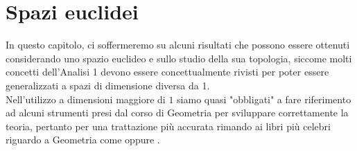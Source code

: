 \chapter{Spazi euclidei}
	\pagestyle{plain}
	\thispagestyle{empty}
	\pagestyle{fancy}	
	In questo capitolo, ci soffermeremo su alcuni risultati che possono essere ottenuti considerando uno spazio euclideo e sullo studio della sua topologia, siccome molti concetti dell'Analisi 1 devono essere concettualmente rivisti per poter essere generalizzati a spazi di dimensione diversa da 1. \\
	Nell'utilizzo a dimensioni maggiore di $1$ siamo quasi "obbligati" a fare riferimento ad alcuni strumenti presi dal corso di Geometria per sviluppare correttamente la teoria, pertanto per una trattazione più accurata rimando ai libri più celebri riguardo a Geometria come \cite{lang} oppure \cite{sernesi}.
	
